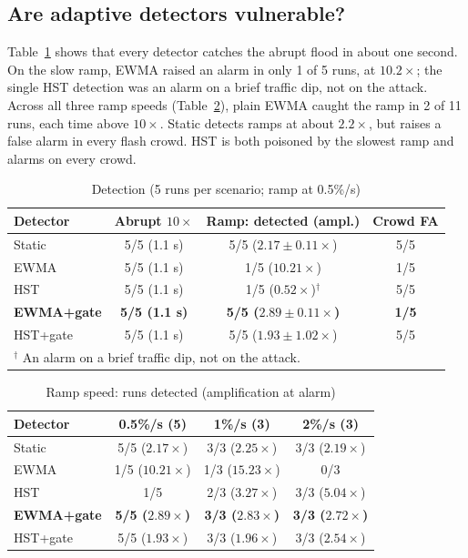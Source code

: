 \documentclass[conference]{IEEEtran}
\begin{document}
\subsection{Are adaptive detectors vulnerable?}
Table~\ref{tab:detection} shows that every detector catches the abrupt flood in about one second. On the slow ramp, EWMA raised an alarm in only 1 of 5 runs, at $10.2\times$; the single HST detection was an alarm on a brief traffic dip, not on the attack. Across all three ramp speeds (Table~\ref{tab:growth}), plain EWMA caught the ramp in 2 of 11 runs, each time above $10\times$. Static detects ramps at about $2.2\times$, but raises a false alarm in every flash crowd. HST is both poisoned by the slowest ramp and alarms on every crowd.

\begin{table}[t]
\centering
\caption{Detection (5 runs per scenario; ramp at 0.5\%/s)}
\label{tab:detection}
\setlength{\tabcolsep}{3.5pt}
\begin{tabular}{lccc}
\toprule
Detector & Abrupt $10\times$ & Ramp: detected (ampl.) & Crowd FA \\
\midrule
Static & 5/5 (1.1 s) & 5/5 ($2.17 \pm 0.11\times$) & 5/5 \\
EWMA & 5/5 (1.1 s) & 1/5 ($10.21\times$) & 1/5 \\
HST & 5/5 (1.1 s) & 1/5 ($0.52\times$)$^{\dagger}$ & 5/5 \\
\textbf{EWMA+gate} & \textbf{5/5 (1.1 s)} & \textbf{5/5 ($2.89 \pm 0.11\times$)} & \textbf{1/5} \\
HST+gate & 5/5 (1.1 s) & 5/5 ($1.93 \pm 1.02\times$) & 5/5 \\
\bottomrule
\multicolumn{4}{l}{\footnotesize $^{\dagger}$ An alarm on a brief traffic dip, not on the attack.}
\end{tabular}
\end{table}

\begin{table}[t]
\centering
\caption{Ramp speed: runs detected (amplification at alarm)}
\label{tab:growth}
\setlength{\tabcolsep}{3pt}
\begin{tabular}{lccc}
\toprule
Detector & 0.5\%/s (5) & 1\%/s (3) & 2\%/s (3) \\
\midrule
Static & 5/5 ($2.17\times$) & 3/3 ($2.25\times$) & 3/3 ($2.19\times$) \\
EWMA & 1/5 ($10.21\times$) & 1/3 ($15.23\times$) & 0/3 \\
HST & 1/5 & 2/3 ($3.27\times$) & 3/3 ($5.04\times$) \\
\textbf{EWMA+gate} & \textbf{5/5 ($2.89\times$)} & \textbf{3/3 ($2.83\times$)} & \textbf{3/3 ($2.72\times$)} \\
HST+gate & 5/5 ($1.93\times$) & 3/3 ($1.96\times$) & 3/3 ($2.54\times$) \\
\bottomrule
\end{tabular}
\end{table}
\end{document}
